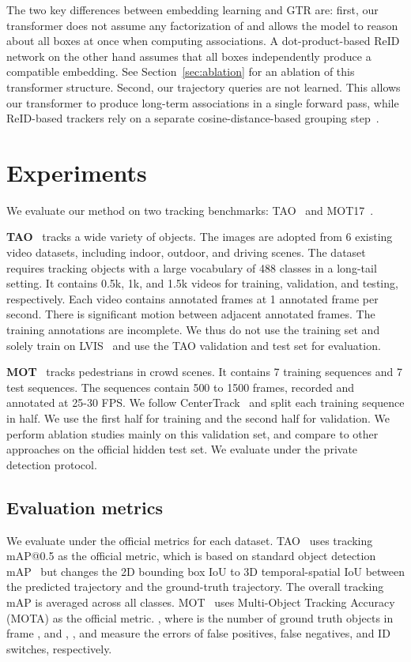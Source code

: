 \documentclass[10pt,twocolumn,letterpaper]{article}
\let\oldsubsection\subsection
\renewcommand{\subsection}[1]{\vspace{-1mm}\oldsubsection{#1}\vspace{-1mm}}
\newcommand{\refsec}[1]{Section~\ref{sec:#1}}
\begin{document}
The two key differences between embedding learning and GTR are: first, our transformer does not assume any factorization of  and allows the model to reason about all boxes at once when computing associations.
A dot-product-based ReID network on the other hand assumes that all boxes independently produce a compatible embedding.
See \refsec{ablation} for an ablation of this transformer structure.
Second, our trajectory queries are not learned.
This allows our transformer to produce long-term associations in a single forward pass, while ReID-based trackers rely on a separate cosine-distance-based grouping step~\cite{zhang2020fair,wang2019towards}.

\section{Experiments}
We evaluate our method on two tracking benchmarks: TAO~\cite{dave2020tao} and MOT17~\cite{MOT16}.

\textbf{TAO}~\cite{dave2020tao} tracks a wide variety of objects.
The images are adopted from 6 existing video datasets, including indoor, outdoor, and driving scenes. 
The dataset requires tracking objects with a large vocabulary of 488 classes in a long-tail setting.
It contains 0.5k, 1k, and 1.5k videos for training, validation, and testing, respectively.
Each video contains  annotated frames at 1 annotated frame per second.
There is significant motion between adjacent annotated frames.
The training annotations are incomplete.
We thus do not use the training set and solely train on LVIS~\cite{gupta2019lvis} and use the TAO validation and test set for evaluation.

\textbf{MOT}~\cite{MOT16} tracks pedestrians in crowd scenes. 
It contains 7 training sequences and 7 test sequences. The sequences contain 500 to 1500 frames, recorded and annotated at 25-30 FPS. 
We follow CenterTrack~\cite{zhou2020tracking} and split each training sequence in half.
We use the first half for training and the second half for validation.
We perform ablation studies mainly on this validation set, and compare to other approaches on the official hidden test set.
We evaluate under the private detection protocol. 

\subsection{Evaluation metrics}
We evaluate under the official metrics for each dataset.
TAO~\cite{dave2020tao} uses tracking mAP@0.5 as the official metric, which is based on standard object detection mAP~\cite{lin2014microsoft} but changes the 2D bounding box IoU to 3D temporal-spatial IoU between the predicted trajectory and the ground-truth trajectory. The overall tracking mAP is averaged across all classes.
MOT~\cite{MOT16} uses Multi-Object Tracking Accuracy (MOTA) as the official metric.
,
where  is the number of ground truth objects in frame , and , , and  measure the errors of false positives, false negatives, and ID switches, respectively.
\end{document}
